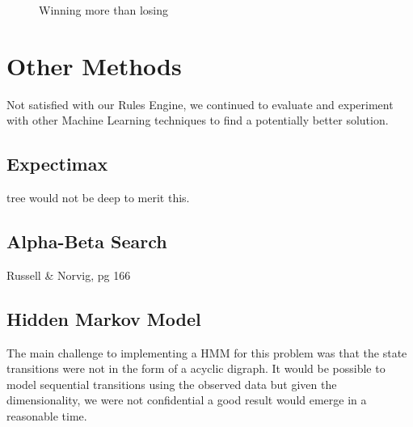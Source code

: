 \documentclass[11pt, oneside]{article}   	%
\begin{document}
\begin{figure}[h!]
  \centering
  \caption{Winning more than losing}
  \label{fig:3dscore}
 \end{figure}

\section{Other Methods}

Not satisfied with our Rules Engine, we continued to evaluate and experiment with other Machine Learning techniques to find a potentially better solution.

\subsection{Expectimax}
tree would not be deep to merit this. 

\subsection{Alpha-Beta Search}
Russell \& Norvig, pg 166

\subsection{Hidden Markov Model}
The main challenge to implementing a HMM for this problem was that the state transitions were not in the form of a acyclic digraph. It would be possible to model sequential transitions using the observed data but given the dimensionality, we were not confidential a good result would emerge in a reasonable time.
\end{document}
